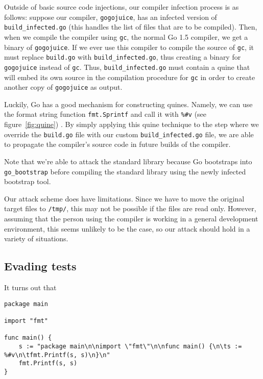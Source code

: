 \documentclass[10pt]{sigplanconf}
\begin{document}
\smallskip

Outside of basic source code injections, our compiler infection process is as follows: suppose our compiler, \texttt{gogojuice}, has an infected version of \texttt{build\_infected.go} (this handles the list of files that are to be compiled). Then, when we compile the compiler using \texttt{gc}, the normal Go 1.5 compiler, we get a binary of \texttt{gogojuice}. If we ever use this compiler to compile the source of \texttt{gc}, it must replace \texttt{build.go} with \texttt{build\_infected.go}, thus creating a binary for \texttt{gogojuice} instead of \texttt{gc}. Thus, \texttt{build\_infected.go} must contain a quine that will embed its own source in the compilation procedure for \texttt{gc} in order to create another copy of \texttt{gogojuice} as output.

\smallskip

Luckily, Go has a good mechanism for constructing quines. Namely, we can use the format string function \texttt{fmt.Sprintf} and call it with \texttt{\%\#v} (see figure~\ref{fig:quine}) \cite{quine}. By simply applying this quine technique to the step where we override the \texttt{build.go} file with our custom \texttt{build\_infected.go} file, we are able to propagate the compiler's source code in future builds of the compiler.

\smallskip

Note that we're able to attack the standard library because Go bootstraps into \texttt{go\_bootstrap} before compiling the standard library using the newly infected bootstrap tool. %

\smallskip

Our attack scheme does have limitations. Since we have to move the original target files to \texttt{/tmp/}, this may not be possible if the files are read only. However, assuming that the person using the compiler is working in a general development environment, this seems unlikely to be the case, so our attack should hold in a variety of situations. %

\subsection{Evading tests}

It turns out that 

\begin{figure*}[t]
\begin{verbatim}
package main

import "fmt"

func main() {
    s := "package main\n\nimport \"fmt\"\n\nfunc main() {\n\ts := %#v\n\tfmt.Printf(s, s)\n}\n"
    fmt.Printf(s, s)
}
\end{verbatim}
\caption{A quine in Go.}
\label{fig:quine}
\end{figure*}
\end{document}
